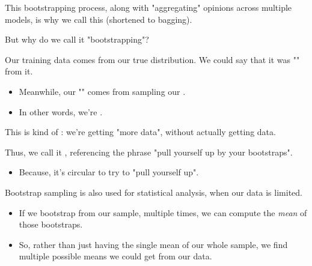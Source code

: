         This bootstrapping process, along with "aggregating" opinions across multiple models, is why we call this  (shortened to bagging).

        But why do we call it "bootstrapping"?\\

        \begin{remark*}
            Our training data comes from our true distribution. We could say that it was "" from it.

            \begin{itemize}
                \item Meanwhile, our "" comes from sampling our .

                \item In other words, we're .
            \end{itemize}

            This is kind of : we're getting "more data", without actually getting  data.

            \subsecdiv

            Thus, we call it , referencing the phrase "pull yourself up by your bootstraps".

            \begin{itemize}
                \item Because, it's circular to try to "pull yourself up".
            \end{itemize}
        \end{remark*}

        Bootstrap sampling is also used for statistical analysis, when our data is limited.

        \begin{itemize}
            \item If we bootstrap from our sample, multiple times, we can compute the \textit{mean} of those bootstraps.

            \item So, rather than just having the single mean of our whole sample, we find multiple possible means we could get from our data.
        \end{itemize}




